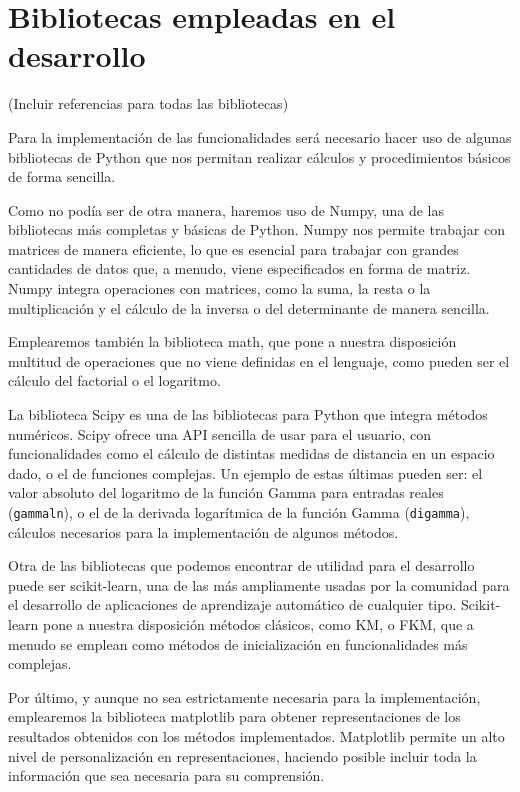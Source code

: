\section{Bibliotecas empleadas en el desarrollo}

(Incluir referencias para todas las bibliotecas)

Para la implementación de las funcionalidades será necesario hacer uso de algunas bibliotecas de Python que nos permitan realizar cálculos y procedimientos básicos de forma sencilla.

Como no podía ser de otra manera, haremos uso de Numpy, una de las bibliotecas más completas y  básicas de Python. Numpy nos permite trabajar con matrices de manera eficiente, lo que es esencial para trabajar con grandes cantidades de datos que, a menudo, viene especificados en forma de matriz. Numpy integra operaciones con matrices, como la suma, la resta o la multiplicación y el cálculo de la inversa o del determinante de manera sencilla.

Emplearemos también la biblioteca math, que pone a nuestra disposición multitud de operaciones que no viene definidas en el lenguaje, como pueden ser el cálculo del factorial o el logaritmo.

La biblioteca Scipy es una de las bibliotecas para Python que integra métodos numéricos. Scipy ofrece una API sencilla de usar para el usuario, con funcionalidades como el cálculo de distintas medidas de distancia en un espacio dado, o el de funciones complejas. Un ejemplo de estas últimas pueden ser: el valor absoluto del logaritmo de la función Gamma para entradas reales (\texttt{gammaln}), o el de la derivada logarítmica de la función Gamma (\texttt{digamma}), cálculos necesarios para la implementación de algunos métodos.

Otra de las bibliotecas que podemos encontrar de utilidad para el desarrollo puede ser scikit-learn, una de las más ampliamente usadas por la comunidad para el desarrollo de aplicaciones de aprendizaje automático de cualquier tipo. Scikit-learn pone a nuestra disposición métodos clásicos, como \acf{KM}, o \acf{FKM}, que a menudo se emplean como métodos de inicialización en funcionalidades más complejas.

Por último, y aunque no sea estrictamente necesaria para la implementación, emplearemos la biblioteca matplotlib para obtener representaciones de los resultados obtenidos con los métodos implementados. Matplotlib permite un alto nivel de personalización en representaciones, haciendo posible incluir toda la información que sea necesaria para su comprensión. 

